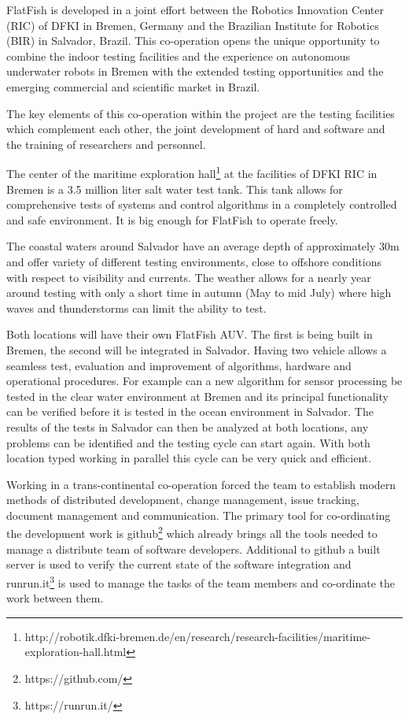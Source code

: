 \documentclass[conference]{IEEEtran}
\begin{document}
FlatFish is developed in a joint effort between the Robotics Innovation Center (RIC) of DFKI in Bremen, Germany and the Brazilian Institute for Robotics (BIR) in Salvador, Brazil. This co-operation opens the unique opportunity to combine the indoor testing facilities and the experience on autonomous underwater robots in Bremen with the extended testing opportunities and the emerging commercial and scientific market in Brazil.

The key elements of this co-operation within the project are the testing facilities which complement each other, the joint development of hard and software and the training of researchers and personnel.

The center of the maritime exploration hall\footnote{http://robotik.dfki-bremen.de/en/research/research-facilities/maritime-exploration-hall.html} at the facilities of DFKI RIC in Bremen is a 3.5 million liter salt water test tank. This tank allows for comprehensive tests of systems and control algorithms in a completely controlled and safe environment. It is big enough for FlatFish to operate freely.

The coastal waters around Salvador have an average depth of approximately 30m and offer variety of different testing environments, close to offshore conditions with respect to visibility and currents. The weather  allows for a nearly year around testing with only a short time in autumn (May to mid July) where high waves and thunderstorms can limit the ability to test. 

Both locations will have their own FlatFish AUV. The first is being built in Bremen, the second will be integrated in Salvador. Having two vehicle allows a seamless test, evaluation and improvement of algorithms, hardware and operational procedures. For example can a new algorithm for sensor processing be tested in the clear water environment at Bremen and its principal functionality can be verified before it is tested in the ocean environment in Salvador. The results of the tests in Salvador can then be analyzed at both locations, any problems can be identified and the testing cycle can start again. With both location typed working in parallel this cycle can be very quick and efficient.

Working in a trans-continental co-operation forced the team to establish modern methods of distributed development, change management, issue tracking, document management and communication. The primary tool for co-ordinating the development work is github\footnote{https://github.com/} which already brings all the tools needed to manage a distribute team of software developers. Additional to github a built server is used to verify the current state of the software integration and runrun.it\footnote{https://runrun.it/} is used to manage the tasks of the team members and co-ordinate the work between them. 
\end{document}
